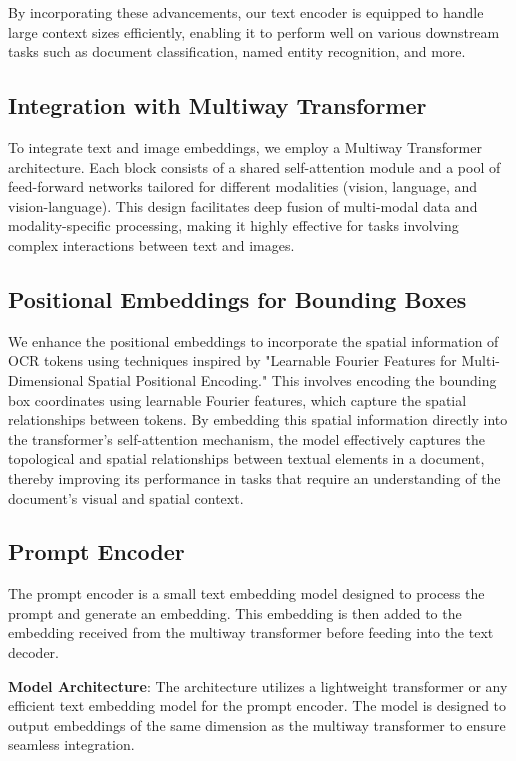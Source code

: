 \documentclass{article}
\begin{document}
By incorporating these advancements, our text encoder is equipped to handle large context sizes efficiently, enabling it to perform well on various downstream tasks such as document classification, named entity recognition, and more.

\subsection{Integration with Multiway Transformer}

To integrate text and image embeddings, we employ a Multiway Transformer architecture. Each block consists of a shared self-attention module and a pool of feed-forward networks tailored for different modalities (vision, language, and vision-language). This design facilitates deep fusion of multi-modal data and modality-specific processing, making it highly effective for tasks involving complex interactions between text and images.

\subsection{Positional Embeddings for Bounding Boxes}

We enhance the positional embeddings to incorporate the spatial information of OCR tokens using techniques inspired by "Learnable Fourier Features for Multi-Dimensional Spatial Positional Encoding." This involves encoding the bounding box coordinates using learnable Fourier features, which capture the spatial relationships between tokens. By embedding this spatial information directly into the transformer's self-attention mechanism, the model effectively captures the topological and spatial relationships between textual elements in a document, thereby improving its performance in tasks that require an understanding of the document's visual and spatial context.

\subsection{Prompt Encoder}

The prompt encoder is a small text embedding model designed to process the prompt and generate an embedding. This embedding is then added to the embedding received from the multiway transformer before feeding into the text decoder.

\textbf{Model Architecture}:
The architecture utilizes a lightweight transformer or any efficient text embedding model for the prompt encoder. The model is designed to output embeddings of the same dimension as the multiway transformer to ensure seamless integration.
\end{document}
